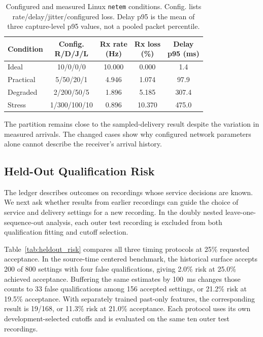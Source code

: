 \documentclass[journal]{IEEEtran}
\newcommand{\revision}[1]{#1}
\begin{document}
\begin{table}[!tb]
    \centering
    \scriptsize
    \setlength{\tabcolsep}{2.5pt}
    \caption{Configured and measured Linux \texttt{netem} conditions.
    Config. lists rate/delay/jitter/configured loss. Delay p95 is the
    mean of three capture-level p95 values, not a pooled packet
    percentile.}
    \label{tab:netem_result}
    \begin{tabular}{@{}lcccc@{}}
        \toprule
        Condition &
        \shortstack{Config.\\R/D/J/L} &
        \shortstack{Rx rate\\(Hz)} &
        \shortstack{Rx loss\\(\%)} &
        \shortstack{Delay\\p95 (ms)} \\
        \midrule
        Ideal     & 10/0/0/0        & 10.000 & 0.000  & 1.4 \\
        Practical & 5/50/20/1       & 4.946  & 1.074  & 97.9 \\
        Degraded  & 2/200/50/5      & 1.896  & 5.185  & 307.4 \\
        Stress    & 1/300/100/10     & 0.896  & 10.370 & 475.0 \\
        \bottomrule
    \end{tabular}
\end{table}

The partition remains close to the sampled-delivery result despite the
variation in measured arrivals. The changed cases show why configured
network parameters alone cannot describe the receiver's arrival history.


\subsection{Held-Out Qualification Risk}
\label{subsec:heldout_results}

The ledger describes outcomes on recordings whose service decisions are
known. We next ask whether results from earlier recordings can guide the
choice of service and delivery settings for a new recording. In the
doubly nested leave-one-sequence-out analysis, each outer test recording
is excluded from both qualification fitting and cutoff selection.

\revision{Table~\ref{tab:heldout_risk} compares all three timing protocols
at 25\% requested acceptance. In the source-time centered benchmark,
the historical surface accepts 200 of 800 settings with four false
qualifications, giving 2.0\% risk at 25.0\% achieved acceptance.
Buffering the same estimates by 100~ms changes those counts to 33 false
qualifications among 156 accepted settings, or 21.2\% risk at 19.5\%
acceptance. With separately trained past-only features, the corresponding
result is 19/168, or 11.3\% risk at 21.0\% acceptance. Each protocol uses
its own development-selected cutoffs and is evaluated on the same ten
outer test recordings.}
\end{document}

